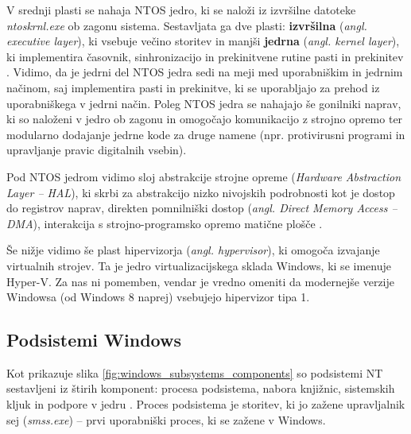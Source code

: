 \documentclass[a4paper,12pt,openright]{book}
\begin{document}
V srednji plasti se nahaja NTOS jedro, ki se naloži iz izvršilne datoteke \textit{ntoskrnl.exe} ob zagonu sistema.
Sestavljata ga dve plasti: \textbf{izvršilna} (\textit{angl. executive layer}), ki vsebuje večino storitev in manjši \textbf{jedrna} (\textit{angl. kernel layer}), ki implementira časovnik, sinhronizacijo in prekinitvene rutine pasti in prekinitev \cite{Tanenbaum_Bos_2023}.
Vidimo, da je jedrni del NTOS jedra sedi na meji med uporabniškim in jedrnim načinom, saj implementira pasti in prekinitve, ki se uporabljajo za prehod iz uporabniškega v jedrni način.
Poleg NTOS jedra se nahajajo še gonilniki naprav, ki so naloženi v jedro ob zagonu in omogočajo komunikacijo z strojno opremo ter modularno dodajanje jedrne kode za druge namene (npr. protivirusni programi in upravljanje pravic digitalnih vsebin).

Pod NTOS jedrom vidimo sloj abstrakcije strojne opreme (\textit{Hardware Abstraction Layer -- HAL}), ki skrbi za abstrakcijo nizko nivojskih podrobnosti kot je dostop do registrov naprav, direkten pomnilniški dostop (\textit{angl. Direct Memory Access -- DMA}), interakcija s strojno-programsko opremo matične plošče \cite{Tanenbaum_Bos_2023}.

Še nižje vidimo še plast hipervizorja (\textit{angl. hypervisor}), ki omogoča izvajanje virtualnih strojev.
Ta je jedro virtualizacijskega sklada Windows, ki se imenuje Hyper-V.
Za nas ni pomemben, vendar je vredno omeniti da modernejše verzije Windowsa (od Windows 8 naprej) vsebujejo hipervizor tipa 1.

\subsection{Podsistemi Windows} \label{ssec:windows:subsystems}

Kot prikazuje slika \ref{fig:windows_subsystems_components} so podsistemi NT sestavljeni iz štirih komponent: procesa podsistema, nabora knjižnic, sistemskih kljuk in podpore v jedru \cite{Tanenbaum_Bos_2023}.
Proces podsistema je storitev, ki jo zažene upravljalnik sej (\textit{smss.exe}) -- prvi uporabniški proces, ki se zažene v Windows.
\end{document}
